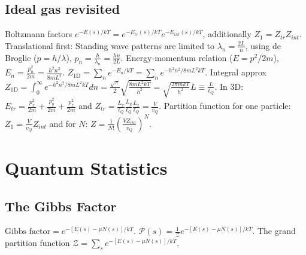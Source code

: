 \documentclass[11pt,twocolumn]{amsart}
\begin{document}
\subsection{Ideal gas revisited}
Boltzmann factors $ e^{-E(s)/kT} = e^{-E_{tr}(s)/kT} e^{-E_{int}(s)/kT} $, additionally $ Z_1 = Z_{tr} Z_{int} $. Translational first: Standing wave patterns are limited to $ \lambda_n = \frac{2L}{n} $, using de Broglie ($p=h/\lambda$), $ p_n = \frac{h}{\lambda_n}=\frac{hn}{2L} $. Energy-momentum relation ($E=p^2/2m$), $ E_n = \frac{p_n^2}{2m}=\frac{h^2n^2}{8mL^2}$. $ Z_{\text{1D}} = \sum_n e^{-E_n/kT} = \sum_n e^{-h^2n^2/8mL^2 kT}$. Integral approx $ Z_{\text{1D}} = \int_0^{\infty} e^{-h^2n^2/8mL^2 kT} dn = \frac{\sqrt{\pi}}{2} \sqrt{\frac{8mL^2kT}{h^2}} = \sqrt{\frac{2\pi mkT}{h^2}}L \equiv \frac{L}{\ell_Q}$. In 3D: $ E_{tr} = \frac{p_x^2}{2m} + \frac{p_y^2}{2m} + \frac{p_z^2}{2m}$ and $ Z_{tr} = \frac{L_x}{\ell_Q}\frac{L_y}{\ell_Q}\frac{L_z}{\ell_Q} = \frac{V}{v_Q} $. Partition function for one particle: $ Z_1 = \frac{V}{v_Q}Z_{int}$ and for $N$: $ Z = \frac{1}{N!} \left(\frac{V Z_{int}}{v_Q} \right)^N $.

\section{Quantum Statistics}

\subsection{The Gibbs Factor}
$\text{Gibbs factor} = e^{-[E(s)-\mu N(s)]/kT}$. $\mathcal{P}(s) = \frac{1}{\mathcal{Z}}e^{-[E(s)-\mu N(s)]/kT}$. The grand partition function $\mathcal{Z} = \sum_s e^{-[E(s)-\mu N(s)]/kT}$.
\end{document}
